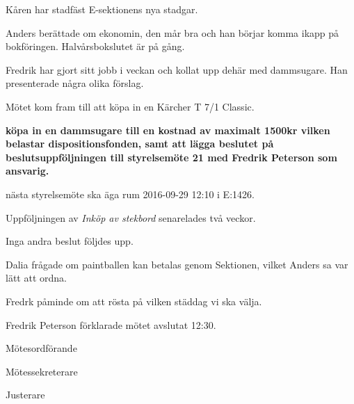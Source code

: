 \documentclass[10pt]{article}
\def\mo{Fredrik Peterson}
\def\ms{Erik Månsson}
\def\ji{Johannes Koch}
\begin{document}
\begin{paragrafer}
\begin{paragrafer}
Kåren har stadfäst E-sektionens nya stadgar.

Anders berättade om ekonomin, den mår bra och han börjar komma ikapp på bokföringen. Halvårsbokslutet är på gång.

\end{paragrafer}

Fredrik har gjort sitt jobb i veckan och kollat upp dehär med dammsugare. Han presenterade några olika förslag.

Mötet kom fram till att köpa in en Kärcher T 7/1 Classic.

\textbf{\Mba köpa in en dammsugare till en kostnad av maximalt 1500kr vilken belastar dispositionsfonden, samt att lägga beslutet på beslutsuppföljningen till styrelsemöte 21 med Fredrik Peterson som ansvarig.}

\Mba nästa styrelsemöte ska äga rum 2016-09-29 12:10 i E:1426.

Uppföljningen av \emph{Inköp av stekbord} senarelades två veckor.

Inga andra beslut följdes upp.

Dalia frågade om paintballen kan betalas genom Sektionen, vilket Anders sa var lätt att ordna.

Fredrk påminde om att rösta på vilken städdag vi ska välja.

{\mo} förklarade mötet avslutat 12:30.

\end{paragrafer}

\hidesignfoot
\begin{signatures}{3}
\signature{\mo}{Mötesordförande}
\signature{\ms}{Mötessekreterare}
\signature{\ji}{Justerare}
\end{signatures}
\end{document}
